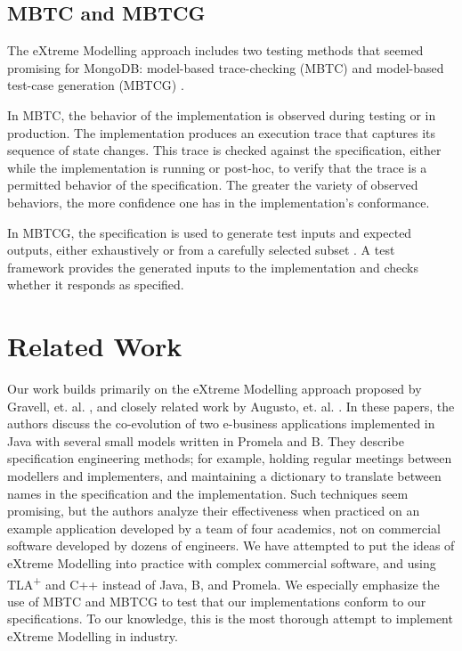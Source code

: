 \documentclass{vldb}
\begin{document}
\subsection{MBTC and MBTCG}
\label{subsec:background_mbtc_mbt}

The eXtreme Modelling approach includes two testing methods that seemed promising for MongoDB: model-based trace-checking (MBTC) \cite{Jard83AnApproachToTestingSpecifications, MBTC} and model-based test-case generation (MBTCG) \cite{Utting06PracticalModelBasedTesting}. 

In MBTC, the behavior of the implementation is observed during testing or in production.
The implementation produces an execution trace that captures its sequence of state changes.
This trace is checked against the specification, either while the implementation is running or post-hoc, to verify that the trace is a permitted behavior of the specification.
The greater the variety of observed behaviors, the more confidence one has in the implementation's conformance.

In MBTCG, the specification is used to generate test inputs and expected outputs, either exhaustively or from a carefully selected subset \cite{Dick93AutomatingGenerationOfTests}.
A test framework provides the generated inputs to the implementation and checks whether it responds as specified.

\section{Related Work}
\label{sec:related_work}

Our work builds primarily on the eXtreme Modelling approach proposed by Gravell, et. al. \cite{Gravell11ConcurrentDevelopmentOfModelAndImplementation}, and closely related work by Augusto, et. al. \cite{Augusto03ValidatingBusinessSystems}. 
In these papers, the authors discuss the co-evolution of two e-business applications implemented in Java with several small models written in Promela and B.
They describe specification engineering methods; for example, holding regular meetings between modellers and implementers, and maintaining a dictionary to translate between names in the specification and the implementation.
Such techniques seem promising, but the authors analyze their effectiveness when practiced on an example application developed by a team of four academics, not on commercial software developed by dozens of engineers.
We have attempted to put the ideas of eXtreme Modelling into practice with complex commercial software, and using TLA\textsuperscript{+} and C++ instead of Java, B, and Promela.
We especially emphasize the use of MBTC and MBTCG to test that our implementations conform to our specifications.
To our knowledge, this is the most thorough attempt to implement eXtreme Modelling in industry.
\end{document}
